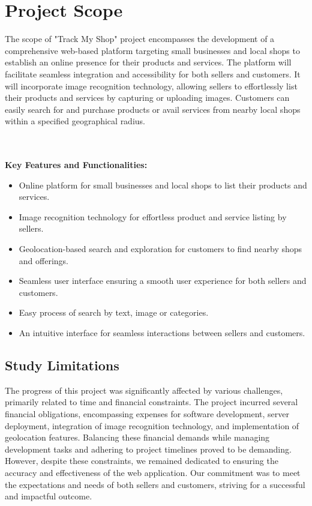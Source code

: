 \vspace{0.5cm}
\section{Project Scope}
The scope of "Track My Shop" project encompasses the development of a comprehensive web-based platform targeting small businesses and local shops to establish an online presence for their products and services. The platform will facilitate seamless integration and accessibility for both sellers and customers. It will incorporate image recognition technology, allowing sellers to effortlessly list their products and services by capturing or uploading images. Customers can easily search for and purchase products or avail services from nearby local shops within a specified geographical radius.

\textbf{\\\\Key Features and Functionalities:}
\begin{itemize}
	\item Online platform for small businesses and local shops to list their products and services.
	\item Image recognition technology for effortless product and service listing by sellers.
	\item Geolocation-based search and exploration for customers to find nearby shops and offerings.
	\item Seamless user interface ensuring a smooth user experience for both sellers and customers.
	\item Easy process of search by text, image or categories.
	\item An intuitive interface for seamless interactions between sellers and customers.
\end{itemize}

\vspace{0.5cm}
\subsection{Study Limitations}

The progress of this project was significantly affected by various challenges, primarily related to time and financial constraints. The project incurred several financial obligations, encompassing expenses for software development, server deployment, integration of image recognition technology, and implementation of geolocation features. Balancing these financial demands while managing development tasks and adhering to project timelines proved to be demanding. However, despite these constraints, we remained dedicated to ensuring the accuracy and effectiveness of the web application. Our commitment was to meet the expectations and needs of both sellers and customers, striving for a successful and impactful outcome.

